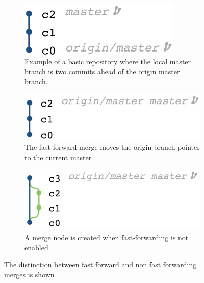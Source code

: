 \begin{figure}[htpb]
  \centering
  \begin{subfigure}[b]{0.5\textwidth}
    \includegraphics[width=0.85\textwidth]{Figures/background/repos/base_repo.png}
    \caption{Example of a basic repository where the local master branch
      is two commits ahead of the origin master branch.}
  \end{subfigure}

  \begin{subfigure}[b]{0.5\textwidth}
    \includegraphics[width=\textwidth]{Figures/background/repos/fast_forward.png}
    \caption{The fast-forward merge moves the origin branch pointer to
      the current master}
    \label{fig:fast_forwarded_merge}
  \end{subfigure}

  \begin{subfigure}[b]{0.5\textwidth}
    \includegraphics[width=\textwidth]{Figures/background/repos/merge_commit.png}
    \caption{A merge node is created when fast-forwarding is not
      enabled}
    \label{fig:merge_node_merge}
  \end{subfigure}
  \caption{The distinction between fast forward and non fast forwarding
  merges is shown}
  \label{fig:merge_styles}
\end{figure}

